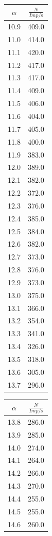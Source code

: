 \begin{table}
  \begin{tabular}[t]{cc}
  \toprule
  $\alpha$ & $\frac{N}{Imp/\si{\second}}$ \\
  \midrule
  10.9 & 409.0\\
  11.0 & 414.0\\
  11.1 & 420.0\\
  11.2 & 417.0\\
  11.3 & 417.0\\
  11.4 & 409.0\\
  11.5 & 406.0\\
  11.6 & 404.0\\
  11.7 & 405.0\\
  11.8 & 400.0\\
  11.9 & 383.0\\
  12.0 & 389.0\\
  12.1 & 382.0\\
  12.2 & 372.0\\
  12.3 & 376.0\\
  12.4 & 385.0\\
  12.5 & 384.0\\
  12.6 & 382.0\\
  12.7 & 373.0\\
  12.8 & 376.0\\
  12.9 & 373.0\\
  13.0 & 375.0\\
  13.1 & 366.0\\
  13.2 & 354.0\\
  13.3 & 341.0\\
  13.4 & 326.0\\
  13.5 & 318.0\\
  13.6 & 305.0\\
  13.7 & 296.0  \\
  \bottomrule
  \end{tabular}
  \begin{tabular}[t]{cc}
  \toprule
  $\alpha$ & $\frac{N}{Imp/\si{\second}}$ \\
  \midrule
  13.8 & 286.0  \\
  13.9 & 285.0  \\
  14.0 & 274.0  \\
  14.1 & 264.0  \\
  14.2 & 266.0  \\
  14.3 & 270.0  \\
  14.4 & 255.0  \\
  14.5 & 255.0  \\
  14.6 & 260.0  \\

\end{tabular}
\end{table}

